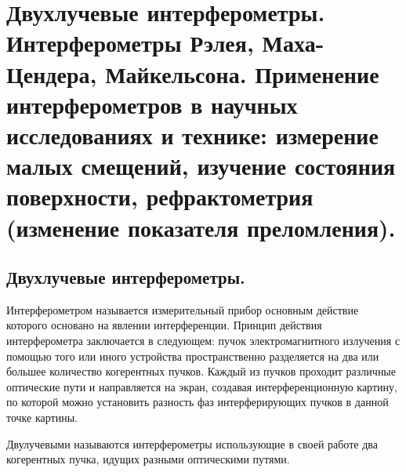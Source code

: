 \section{Двухлучевые интерферометры. Интерферометры Рэлея, Маха-Цендера, Майкельсона. Применение интерферометров в научных исследованиях и технике: измерение малых смещений, изучение состояния поверхности, рефрактометрия (изменение показателя преломления). }
	\subsection{Двухлучевые интерферометры.}
	\begin{definition}
		Интерферометром называется измерительный прибор основным действие которого основано на явлении интерференции.  Принцип действия интерферометра заключается в следующем: пучок электромагнитного излучения с помощью того или иного устройства пространственно разделяется на два или большее количество когерентных пучков. Каждый из пучков проходит различные оптические пути и направляется на экран, создавая интерференционную картину, по которой можно установить разность фаз интерферирующих пучков в данной точке картины.
	\end{definition}
	\begin{definition}
		Двулучевыми называются интерферометры использующие в своей работе два когерентных пучка, идущих разными оптическими путями.
	\end{definition}
